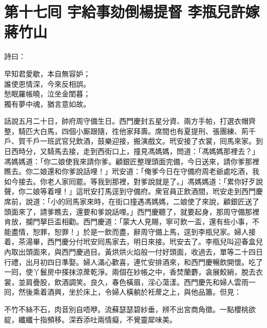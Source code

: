 
\chapter*{第十七囘 宇給事劾倒楊提督 李瓶兒許嫁蔣竹山}


詩曰：

\begin{myquote}
早知君愛歇，本自無容妒；\\誰使恩情深，今來反相誤。\\愁眠羅帳曉，泣坐金閨暮；\\獨有夢中魂，猶言意如故。
\end{myquote}

話說五月二十日，帥府周守備生日。西門慶封五星分資、兩方手帕，打選衣帽齊整，騎匹大白馬，四個小厮跟隨，徃他家拜壽。席間也有夏提刑、張團練、荊千戶、賀千戶一班武官兒飲酒，鼓樂迎接，搬演戲文。玳安接了衣裳，囘馬來家。到日西時分，又騎馬去接，走到西街口上，撞見馮媽媽，問道：「馮媽媽那裡去？」馮媽媽道：「你二娘使我來請你爹。顧銀匠整理頭面完備，今日送來，請你爹那裡瞧去。你二娘還和你爹說話哩！」玳安道：「俺爹今日在守備府周老爺處吃酒，我如今接去。你老人家囘罷。等我到那裡，對爹說就是了。」馮媽媽道：「累你好歹說聲，你二娘等着哩！」這玳安打馬逕到守備府。衆官員正飲酒間，玳安走到西門慶席前，說道：「小的囘馬家來時，在街口撞遇馮媽媽，二娘使了來說，顧銀匠送了頭面來了，請爹瞧去，還要和爹說話哩。」西門慶聽了，就要起身，那周守備那裡肯放，攔門拏巨盃相勸。西門慶道：「蒙大人見賜，寧可飲一盃，還有些小事，不能盡情，恕罪，恕罪！」於是一飲而盡，辭周守備上馬，逕到李瓶兒家。婦人接着，茶湯畢，西門慶分付玳安囘馬家去，明日來接。玳安去了。李瓶兒叫迎春盒兒內取出頭面來，與西門慶過目。黃烘烘火焰般一付好頭面，收過去，單等二十四日行禮，出月初四日準娶。婦人滿心歡喜，連忙安排酒來，和西門慶暢飲開懷。吃了一囘，使丫鬟房中搽抹涼蓆乾淨。兩個在紗帳之中，香焚蘭麝，衾展鮫綃，脫去衣裳，並肩疊股，飲酒調笑。良久，春色橫眉，淫心蕩漾。西門慶先和婦人雲雨一囘，然後乘着酒興，坐於床上，令婦人橫躺於衽蓆之上，與他品簫。但見：

\begin{myquote}
不竹不絲不石，肉音別自唔咿。流蘇瑟瑟碧紗垂，辨不出宮商角徵。一點櫻桃欲綻，纖纖十指頻移。深吞添吐兩情癡，不覺靈犀味美。
\end{myquote}

